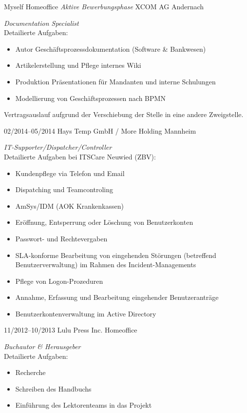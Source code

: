 \documentclass[a4paper,latin]{friggeri-cv} %
\begin{document}
\begin{entrylist}
{Myself}
{Homeoffice}
{\emph{Aktive Bewerbungsphase}
}
{XCOM AG}
{Andernach}
{\emph{Documentation Specialist} \\
	Detailierte Aufgaben:
	\begin{itemize}
		\item Autor Geschäftsprozessdokumentation (Software \& Bankwesen)
		\item Artikelerstellung und Pflege internes Wiki
		\item Produktion Präsentationen für Mandanten und interne Schulungen
		\item Modellierung von Geschäftsprozessen nach BPMN
	\end{itemize}
	Vertragsauslauf aufgrund der Verschiebung der Stelle in eine andere Zweigstelle.
}
\entry
{02/2014--05/2014}
{Hays Temp GmbH / More Holding}
{Mannheim}
{\emph{IT-Supporter/Dispatcher/Controller} \\
Detailierte Aufgaben bei ITSCare Neuwied (ZBV):
\begin{itemize}
\item Kundenpflege via Telefon und Email
\item Dispatching und Teamcontroling
\item AmSys/IDM (AOK Krankenkassen)
\item Eröffnung, Entsperrung oder Löschung von Benutzerkonten
\item Passwort- und Rechtevergaben
\item SLA-konforme Bearbeitung von eingehenden Störungen (betreffend Benutzerverwaltung) im Rahmen des Incident-Managements
\item Pflege von Logon-Prozeduren
\item Annahme, Erfassung und Bearbeitung eingehender Benutzeranträge
\item Benutzerkontenverwaltung im Active Directory
\end{itemize}
}
\entry
{11/2012--10/2013}
{Lulu Press Inc.}
{Homeoffice}
{\emph{Buchautor \& Herausgeber}\\
Detailierte Aufgaben:
\begin{itemize}
\item Recherche
\item Schreiben des Handbuchs
\item Einführung des Lektorenteams in das Projekt

\end{itemize}}
\end{entrylist}
\end{document}
